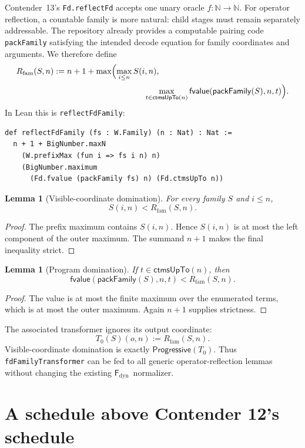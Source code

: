 \documentclass[11pt]{article}
\newtheorem{lemma}[theorem]{Lemma}
\theoremstyle{definition}
\newcommand{\Nat}{\ensuremath{\mathbb{N}}}
\newcommand{\Prog}{\ensuremath{\mathsf{Progressive}}}
\newcommand{\Fd}{\ensuremath{\mathsf{F}_{\mathrm{dyn}}}}
\newcommand{\lean}[1]{\texttt{#1}}
\newcommand{\pack}{\ensuremath{\mathsf{packFamily}}}
\begin{document}
Contender~13's \lean{Fd.reflectFd} accepts one unary oracle $f:\Nat\to\Nat$.
For operator reflection, a countable family is more natural: child stages must
remain separately addressable.  The repository already provides a computable
pairing code \lean{packFamily} satisfying the intended decode equation for
family coordinates and arguments.  We therefore define
\begin{align}
R_{\mathrm{fam}}(S,n)
  := {}& n+1+\max\Bigl(
    \max_{i\le n} S(i,n),\notag\\
   &\hspace{33mm}
    \max_{t\in\mathsf{ctmsUpTo}(n)}
      \mathsf{fvalue}(\pack(S),n,t)
  \Bigr).
\label{eq:family-reflector}
\end{align}
In Lean this is \lean{reflectFdFamily}:
\begin{lstlisting}
def reflectFdFamily (fs : W.Family) (n : Nat) : Nat :=
  n + 1 + BigNumber.maxN
    (W.prefixMax (fun i => fs i n) n)
    (BigNumber.maximum
      (Fd.fvalue (packFamily fs) n) (Fd.ctmsUpTo n))
\end{lstlisting}

\begin{lemma}[Visible-coordinate domination]
For every family $S$ and $i\le n$,
\[
  S(i,n)<R_{\mathrm{fam}}(S,n).
\]
\end{lemma}
\begin{proof}
The prefix maximum contains $S(i,n)$.  Hence $S(i,n)$ is at most the left
component of the outer maximum.  The summand $n+1$ makes the final inequality
strict.
\end{proof}

\begin{lemma}[Program domination]
If $t\in\mathsf{ctmsUpTo}(n)$, then
\[
  \mathsf{fvalue}(\pack(S),n,t)<R_{\mathrm{fam}}(S,n).
\]
\end{lemma}
\begin{proof}
The value is at most the finite maximum over the enumerated terms, which is at
most the outer maximum.  Again $n+1$ supplies strictness.
\end{proof}

The associated transformer ignores its output coordinate:
\[
  T_0(S)(o,n):=R_{\mathrm{fam}}(S,n).
\]
Visible-coordinate domination is exactly \(\Prog(T_0)\).  Thus
\lean{fdFamilyTransformer} can be fed to all generic operator-reflection
lemmas without changing the existing \Fd\ normalizer.

\section{A schedule above Contender 12's schedule}
\end{document}
